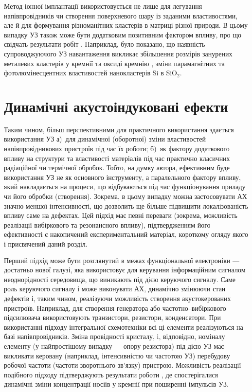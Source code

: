 Метод іонної імплантації використовується не лише для легування напівпровідників чи створення поверхневого шару із заданими властивостями, але й для формування різноманітних кластерів в матриці різної природи.
В цьому випадку УЗ також може бути додатковим позитивним фактором впливу, про що свідчать результати робіт \cite{Roman:2006JAP,Roman:2007APL,Roman:2010JAP,YOlikh2010JL}.
Наприклад, було показано, що наявність супроводжуючого УЗ навантаження викликає збільшення розмірів занурених металевих кластерів у кремнії \cite{Roman:2006JAP} та оксиді кремнію \cite{Roman:2007APL}, зміни парамагнітних \cite{Roman:2010JAP} та фотолюмінесцентних \cite{YOlikh2010JL} властивостей нанокластерів Si в SiO$_2$.



\section{Динамічні акустоіндуковані ефекти}


Таким чином, більш перспективними для практичного використання здається використання УЗ
а)~для динамічної (оборотної) зміни властивостей напівпровідникових пристроїв під час їх роботи;
б)~як фактору додаткового впливу на структури та властивості матеріалів під час практично класичних радіаційної чи термічної обробок.
Тобто, на думку автора, ефективним буде використання УЗ не як основного інструменту, а паралельного фактору впливу, який накладається на процеси, що відбуваються під час функціонування приладу чи його обробки (створення).
Зокрема, в цьому випадку можна застосовувати АХ значно меншої інтенсивності,
що дозволить ще більше підвищити локалізованість впливу саме на дефектах.
Цей підхід має певні переваги (зокрема, можливість реалізації вибіркового та резонансного впливу),
підтвердженням його ефективності є накопичений експериментальний матеріал, короткому огляду якого і присвячений даний розділ.

Перший підхід може бути розглянутий в межах функціональної електроніки --- достатньо нової галузі,
яка використовує для керування інформаційним сигналом неоднорідності середовища,  що виникають під дією керуючого сигналу.
Саме роль керуючого сигналу і може виконувати АХ, динамічно змінюючи стан дефектів і, таким чином, реалізуючи можливість створення акустокерованих пристроїв.
Наприклад, для створення генератора або частотно--вибіркового підсилювача використовують транзистори, резистори, конденсатори.
При використанні підходу інтегральної схемотехніки всі ці елементи реалізуються на базі напівпровідників.
Зміна провідності кристалу, і, відповідно, номіналу елементу (у найпростішому випадку --- опору резистора) під дією УЗ
має викликати керовану (наприклад, інтенсивністю чи частотою УЗ) перебудову робочої частоти (частоти зворотнього зв'язку) пристрою.
Можливість реалізації подібного підходу підтверджують результати роботи \cite{YOlikhTPL2011r}, де спостерігалися динамічні зміни концентрації носіїв у кремнії при поширенні імпульсів УЗ.

